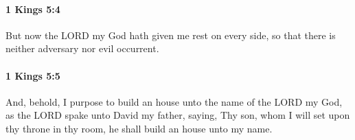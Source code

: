 		\paragraph{1 Kings 5:4} %
			\label{1KINGS-5-4}

			But now the LORD my God hath given me rest on every side, so that there is neither adversary nor evil occurrent.


		\paragraph{1 Kings 5:5} %
			\label{1KINGS-5-5}

			And, behold, I purpose to build an house unto the name of the LORD my God, as the LORD spake unto David my father, saying, Thy son, whom I will set upon thy throne in thy room, he shall build an house unto my name.


